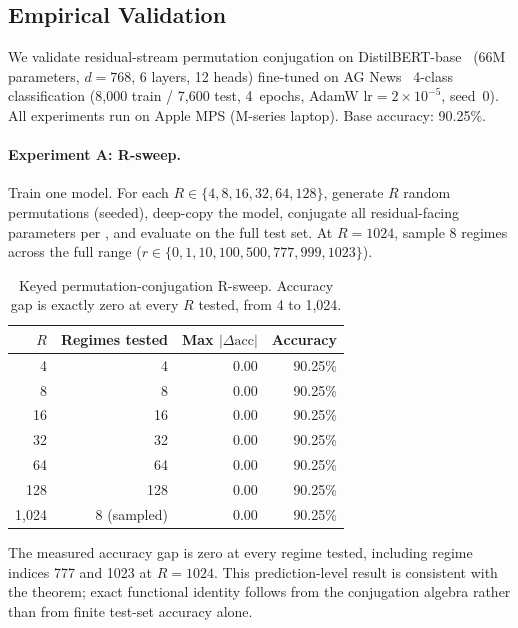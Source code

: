 \documentclass[11pt,a4paper]{article}
\begin{document}
\subsection{Empirical Validation}
\label{sec:superposition-empirical}

We validate residual-stream permutation conjugation on
DistilBERT-base~\citep{sanh2019distilbert} (66M parameters,
$d{=}768$, 6 layers, 12 heads) fine-tuned on AG News~\citep{zhang2015agnews}
4-class classification (8,000 train / 7,600 test, 4~epochs,
AdamW $\mathrm{lr}{=}2{\times}10^{-5}$, seed~0).  All
experiments run on Apple MPS (M-series laptop).  Base accuracy:
90.25\%.

\paragraph{Experiment A: R-sweep.}
Train one model.  For each $R \in \{4, 8, 16, 32, 64, 128\}$,
generate $R$ random permutations (seeded), deep-copy the model,
conjugate all residual-facing parameters per
, and evaluate on the full
test set.  At $R{=}1024$, sample 8 regimes across the full
range ($r \in \{0, 1, 10, 100, 500, 777, 999, 1023\}$).

\begin{table}[ht]
\centering
\caption{Keyed permutation-conjugation R-sweep.  Accuracy gap is
exactly zero at every $R$ tested, from 4 to 1,024.}
\label{tab:r-sweep}
\small
\begin{tabular}{@{}rrrr@{}}
\toprule
$R$ & Regimes tested & Max $|\Delta\mathrm{acc}|$
& Accuracy \\
\midrule
4 & 4 & $0.00$ & 90.25\% \\
8 & 8 & $0.00$ & 90.25\% \\
16 & 16 & $0.00$ & 90.25\% \\
32 & 32 & $0.00$ & 90.25\% \\
64 & 64 & $0.00$ & 90.25\% \\
128 & 128 & $0.00$ & 90.25\% \\
1{,}024 & 8 (sampled) & $0.00$ & 90.25\% \\
\bottomrule
\end{tabular}
\end{table}

The measured accuracy gap is zero at every regime tested, including
regime indices 777 and 1023 at $R{=}1024$.  This prediction-level
result is consistent with the theorem; exact functional identity
follows from the conjugation algebra rather than from finite test-set
accuracy alone.
\end{document}
